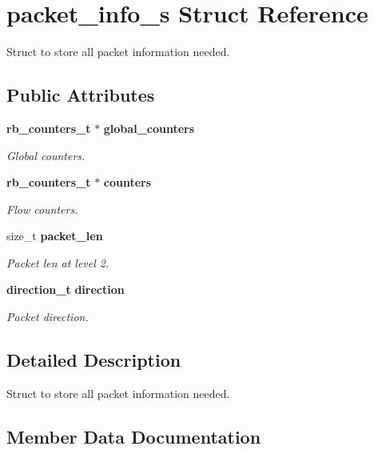 \section{packet\+\_\+info\+\_\+s Struct Reference}
\label{structpacket__info__s}


Struct to store all packet information needed.  


\subsection*{Public Attributes}
\begin{DoxyCompactItemize}
\item 
{\bf rb\+\_\+counters\+\_\+t} $\ast$ {\bf global\+\_\+counters}
\begin{DoxyCompactList}\small\item\em Global counters. \end{DoxyCompactList}\item 
{\bf rb\+\_\+counters\+\_\+t} $\ast$ {\bf counters}
\begin{DoxyCompactList}\small\item\em Flow counters. \end{DoxyCompactList}\item 
size\+\_\+t {\bf packet\+\_\+len}
\begin{DoxyCompactList}\small\item\em Packet len at level 2. \end{DoxyCompactList}\item 
{\bf direction\+\_\+t} {\bf direction}
\begin{DoxyCompactList}\small\item\em Packet direction. \end{DoxyCompactList}\end{DoxyCompactItemize}


\subsection{Detailed Description}
Struct to store all packet information needed. 

\subsection{Member Data Documentation}
